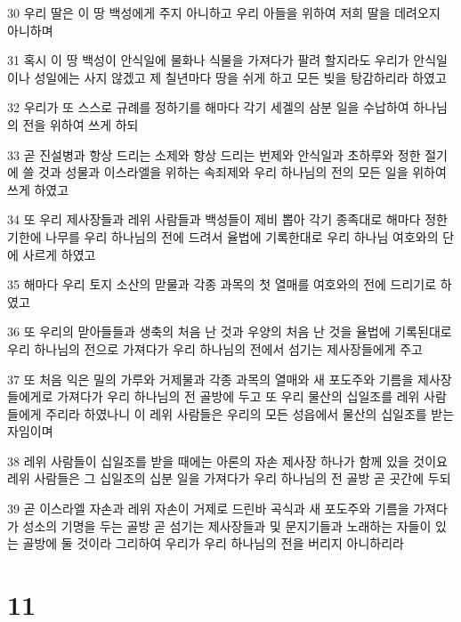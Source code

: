 \par 30 우리 딸은 이 땅 백성에게 주지 아니하고 우리 아들을 위하여 저희 딸을 데려오지 아니하며
\par 31 혹시 이 땅 백성이 안식일에 물화나 식물을 가져다가 팔려 할지라도 우리가 안식일이나 성일에는 사지 않겠고 제 칠년마다 땅을 쉬게 하고 모든 빚을 탕감하리라 하였고
\par 32 우리가 또 스스로 규례를 정하기를 해마다 각기 세겔의 삼분 일을 수납하여 하나님의 전을 위하여 쓰게 하되
\par 33 곧 진설병과 항상 드리는 소제와 항상 드리는 번제와 안식일과 초하루와 정한 절기에 쓸 것과 성물과 이스라엘을 위하는 속죄제와 우리 하나님의 전의 모든 일을 위하여 쓰게 하였고
\par 34 또 우리 제사장들과 레위 사람들과 백성들이 제비 뽑아 각기 종족대로 해마다 정한 기한에 나무를 우리 하나님의 전에 드려서 율법에 기록한대로 우리 하나님 여호와의 단에 사르게 하였고
\par 35 해마다 우리 토지 소산의 맏물과 각종 과목의 첫 열매를 여호와의 전에 드리기로 하였고
\par 36 또 우리의 맏아들들과 생축의 처음 난 것과 우양의 처음 난 것을 율법에 기록된대로 우리 하나님의 전으로 가져다가 우리 하나님의 전에서 섬기는 제사장들에게 주고
\par 37 또 처음 익은 밀의 가루와 거제물과 각종 과목의 열매와 새 포도주와 기름을 제사장들에게로 가져다가 우리 하나님의 전 골방에 두고 또 우리 물산의 십일조를 레위 사람들에게 주리라 하였나니 이 레위 사람들은 우리의 모든 성읍에서 물산의 십일조를 받는 자임이며
\par 38 레위 사람들이 십일조를 받을 때에는 아론의 자손 제사장 하나가 함께 있을 것이요 레위 사람들은 그 십일조의 십분 일을 가져다가 우리 하나님의 전 골방 곧 곳간에 두되
\par 39 곧 이스라엘 자손과 레위 자손이 거제로 드린바 곡식과 새 포도주와 기름을 가져다가 성소의 기명을 두는 골방 곧 섬기는 제사장들과 및 문지기들과 노래하는 자들이 있는 골방에 둘 것이라 그리하여 우리가 우리 하나님의 전을 버리지 아니하리라

\chapter{11}

